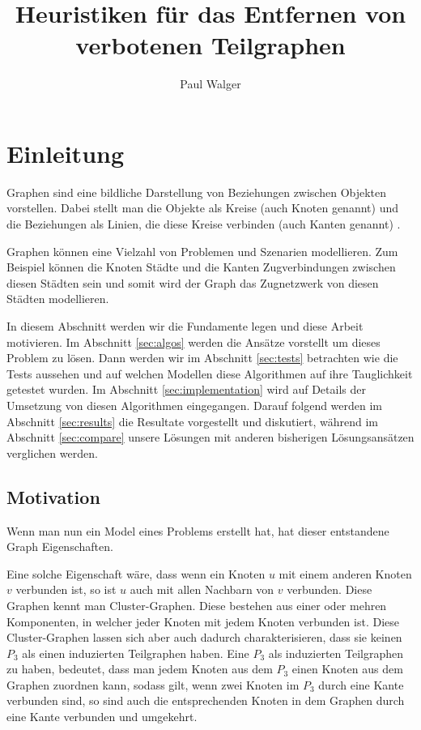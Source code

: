 \documentclass[12pt,a4paper,onecolumn,oneside,titlepage]{article}
\author{Paul Walger}
\title{Heuristiken für das Entfernen von verbotenen Teilgraphen}
\begin{document}
\maketitle
\tableofcontents
\newpage

\section{Einleitung}
Graphen sind eine bildliche Darstellung von Beziehungen zwischen Objekten vorstellen. Dabei stellt man die Objekte als Kreise (auch Knoten genannt) und die Beziehungen als Linien, die diese Kreise verbinden (auch Kanten genannt) \cite{Nastos06}.

Graphen können eine Vielzahl von Problemen und Szenarien modellieren. Zum Beispiel können die Knoten Städte und die Kanten Zugverbindungen zwischen diesen Städten sein und somit wird der Graph das Zugnetzwerk von diesen Städten modellieren. 

In diesem Abschnitt werden wir die Fundamente legen und diese Arbeit motivieren. Im Abschnitt \ref{sec:algos} werden die Ansätze vorstellt um dieses Problem zu lösen. Dann werden wir im Abschnitt \ref{sec:tests} betrachten wie die Tests aussehen und auf welchen Modellen diese Algorithmen auf ihre Tauglichkeit getestet wurden. Im Abschnitt \ref{sec:implementation} wird auf Details der Umsetzung von diesen Algorithmen eingegangen. Darauf folgend werden im Abschnitt \ref{sec:results} die Resultate vorgestellt und diskutiert, während im Abschnitt \ref{sec:compare} unsere Lösungen mit anderen bisherigen Lösungsansätzen verglichen werden.

\subsection{Motivation}
\label{sec:mot}
Wenn man nun ein Model eines Problems erstellt hat, hat dieser entstandene Graph Eigenschaften. 

Eine solche Eigenschaft wäre, dass wenn ein Knoten $u$ mit einem anderen Knoten $v$ verbunden ist, so ist $u$ auch mit allen Nachbarn von $v$ verbunden. Diese Graphen kennt man Cluster-Graphen. Diese bestehen aus einer oder mehren Komponenten, in welcher jeder Knoten mit jedem Knoten verbunden ist.
Diese Cluster-Graphen lassen sich aber auch dadurch charakterisieren, dass sie keinen $P_3$ als einen induzierten Teilgraphen haben. Eine $P_3$ als induzierten Teilgraphen zu haben, bedeutet, dass man jedem Knoten aus dem $P_3$ einen Knoten aus dem Graphen zuordnen kann, sodass gilt, wenn zwei Knoten im $P_3$ durch eine Kante verbunden sind, so sind auch die entsprechenden Knoten in dem Graphen durch eine Kante verbunden und umgekehrt.
 
\end{document}
